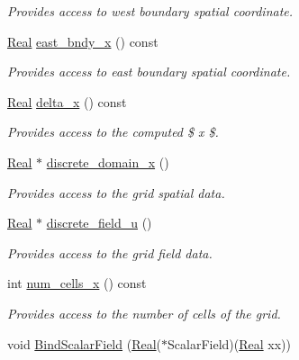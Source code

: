 \begin{DoxyCompactItemize}
\begin{DoxyCompactList}\small\item\em Provides access to west boundary spatial coordinate. \end{DoxyCompactList}\item 
\hyperlink{group__c01-roots_gac080bbbf5cbb5502c9f00405f894857d}{Real} \hyperlink{classmtk_1_1UniStgGrid1D_a3b413aeadcc3d3263f6817f3af1dee95}{east\-\_\-bndy\-\_\-x} () const 
\begin{DoxyCompactList}\small\item\em Provides access to east boundary spatial coordinate. \end{DoxyCompactList}\item 
\hyperlink{group__c01-roots_gac080bbbf5cbb5502c9f00405f894857d}{Real} \hyperlink{classmtk_1_1UniStgGrid1D_a6e7173b01241632cf509496d66b9f74c}{delta\-\_\-x} () const 
\begin{DoxyCompactList}\small\item\em Provides access to the computed \$  x \$. \end{DoxyCompactList}\item 
\hyperlink{group__c01-roots_gac080bbbf5cbb5502c9f00405f894857d}{Real} $\ast$ \hyperlink{classmtk_1_1UniStgGrid1D_a858a63163d7f324ee2c79b1bed51402f}{discrete\-\_\-domain\-\_\-x} ()
\begin{DoxyCompactList}\small\item\em Provides access to the grid spatial data. \end{DoxyCompactList}\item 
\hyperlink{group__c01-roots_gac080bbbf5cbb5502c9f00405f894857d}{Real} $\ast$ \hyperlink{classmtk_1_1UniStgGrid1D_acf28d702f6e702599986afcb253bbfc1}{discrete\-\_\-field\-\_\-u} ()
\begin{DoxyCompactList}\small\item\em Provides access to the grid field data. \end{DoxyCompactList}\item 
int \hyperlink{classmtk_1_1UniStgGrid1D_af1b3729d8afa07be5b2775ed68015b80}{num\-\_\-cells\-\_\-x} () const 
\begin{DoxyCompactList}\small\item\em Provides access to the number of cells of the grid. \end{DoxyCompactList}\item 
void \hyperlink{classmtk_1_1UniStgGrid1D_a438cda229830d0e2f35c615e70b59a76}{Bind\-Scalar\-Field} (\hyperlink{group__c01-roots_gac080bbbf5cbb5502c9f00405f894857d}{Real}($\ast$Scalar\-Field)(\hyperlink{group__c01-roots_gac080bbbf5cbb5502c9f00405f894857d}{Real} xx))

\end{DoxyCompactItemize}
